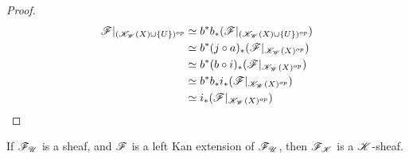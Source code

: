 \documentclass[../../thesis.tex]{subfiles}
\begin{document}
\begin{proof}
    \begin{align}
        \mathscr{F}|_{(\mathscr{K}_{\mathscr{W}}(X)\cup \{U\})^{op}} & \simeq b^*b_*(\mathscr{F}|_{(\mathscr{K}_{\mathscr{W}}(X)\cup \{U\})^{op}}) \\
                                        & \simeq b^*(j\circ a)_* (\mathscr{F}|_{\mathscr{K}_{\mathscr{W}}(X)^{op}})   \\
                                        & \simeq b^*(b \circ i)_*(\mathscr{F}|_{\mathscr{K}_{\mathscr{W}}(X)^{op}})   \\
                                        & \simeq b^*b_*i_*(\mathscr{F}|_{\mathscr{K}_{\mathscr{W}}(X)^{op}})          \\
                                        & \simeq i_*(\mathscr{F}|_{\mathscr{K}_{\mathscr{W}}(X)^{op}})
    \end{align}
\end{proof}
\begin{lemma}
    If $\mathscr{F}_{\mathscr{U}}$ is a sheaf, and $\mathscr{F}$ is a left Kan extension of $\mathscr{F}_{\mathscr{U}}$, then $\mathscr{F}_{\mathscr{K}}$ is a $\mathscr{K}$-sheaf.
\end{lemma}
\end{document}

